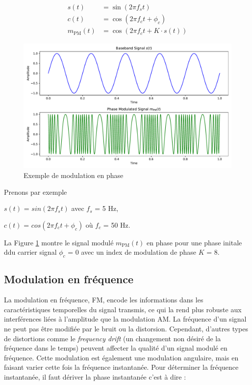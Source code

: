 \begin{align}
    s(t) &= \sin(2\pi f_{s}t) \\
    c(t) &= \cos(2\pi f_{c}t + \phi_{c}) \\
    m_\mathrm{PM}(t) &= \cos\left(2\pi f_{c}t + K \cdot s(t)\right)
\end{align}

\begin{figure}[h]
\centering

\includegraphics[scale=0.5]{images/PM_MOD.pdf}
\caption{Exemple de modulation en phase}\label{term3}
\end{figure}

Prenons par exemple

\vspace{0.1cm}

$s(t)$ = $sin(2\pi f_{s}t)$ avec $f_{s}$ = 5 Hz,

$c(t)$ = $cos(2\pi f_{c}t + \phi_{c})$ où $f_{c}$ = 50 Hz.

\vspace{0.1cm}

La Figure \ref{term3} montre le signal modulé $m_\mathrm{PM}(t)$ en phase pour une phase initale ddu carrier signal $\phi_{c}$ = 0 avec un index de modulation de phase $K$ = 8.




\subsection{Modulation en fréquence}

La modulation en fréquence, \ac{FM}, encode les informations dans les caractéristiques temporelles du signal transmis, ce qui la rend plus robuste aux interférences liées à l'amplitude que la modulation AM. La fréquence d'un signal ne peut pas être modifiée par le bruit ou la distorsion. Cependant, d'autres types de distortions comme le \textit{frequency drift} (un changement non désiré de la fréquence dans le temps) peuvent affecter la qualité d'un signal modulé en fréquence. Cette modulation est également une modulation angulaire, mais en faisant varier cette fois la fréquence instantanée. Pour déterminer la fréquence instantanée, il faut dériver la phase instantanée c'est à dire :


